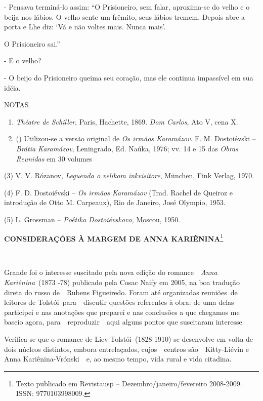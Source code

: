 - Pensava terminá-lo assim: ``O Prisioneiro, sem falar, aproxima-se do
velho e o beija nos lábios. O velho sente um frêmito, seus lábios
tremem. Depois abre a porta e Lhe diz: `Vá e não voltes mais. Nunca
mais'.

O Prisioneiro sai.''

- E o velho?

- O beijo do Prisioneiro queima seu coração, mas ele continua impassível
em sua idéia.

NOTAS

\begin{enumerate}
\def\labelenumi{(\arabic{enumi})}
\item
  \emph{Théatre de Schiller}, Paris, Hachette, 1869. \emph{Dom Carlos},
  Ato V, cena X.
\item
  () Utilizou-se a versão original de \emph{Os irmãos Karamázov}. F. M.
  Dostoiévski -- \emph{Brátia Karamázov}, Leningrado, Ed. Naúka, 1976;
  vv. 14 e 15 das \emph{Obras Reunidas} em 30 volumes
\end{enumerate}

(3) V. V. Rózanov, \emph{Leguenda o velikom inkvisítore}, München, Fink
Verlag, 1970.

(4) F. D. Dostoiévski -- \emph{Os irmãos Karamázov} (Trad. Rachel de
Queiroz e introdução de Otto M. Carpeaux), Rio de Janeiro, José Olympio,
1953.

(5) L. Grossman -- \emph{Poétika Dostoiévskovo,} Moscou, 1950.

\textbf{CONSIDERAÇÕES À MARGEM DE ANNA KARIÊNINA}\footnote{Texto
  publicado em Revistausp -- Dezembro/janeiro/fevereiro 2008-2009. ISSN:
  9770103998009.}

~

Grande foi o interesse suscitado pela nova edição do romance~~\emph{Anna
Kariênina}~(1873 -78) publicado pela Cosac Naify em 2005, na boa
tradução direta do russo de~~Rubens Figueiredo. Foram até organizadas
reuniões~de leitores de Tolstói~para~~discutir questões referentes à
obra: de uma delas participei e nas anotações que preparei e nas
conclusões a que chegamos me baseio agora, para~~reproduzir~~aqui alguns
pontos que suscitaram interesse.

Verifica-se que o romance de Liev Tolstói~(1828-1910) se desenvolve em
volta de dois núcleos distintos, embora entrelaçados, cujos~~centros
são~~Kitty-Liévin e Anna Kariênina-Vrónski~~e, ao mesmo tempo, vida
rural e vida citadina.

